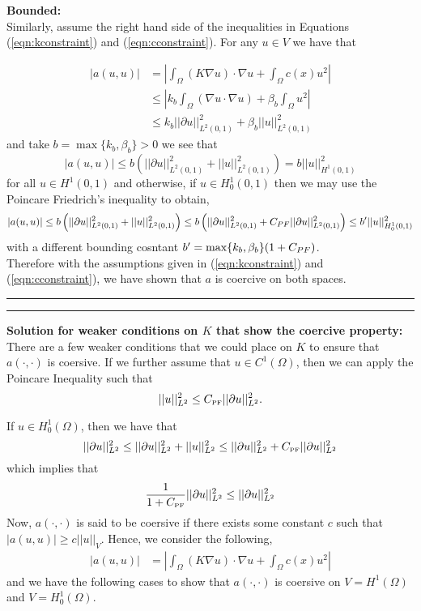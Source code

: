 \documentclass[12pt]{amsart}
\begin{document}
 \noindent\textbf{Bounded:}\\
 
 Similarly, assume the right hand side of the inequalities in Equations (\ref{eqn:kconstraint}) and (\ref{eqn:cconstraint}). For any $u\in V$ we have that 
 
 \begin{align*}
	|a(u,u)| & = \left| \int_\Omega (K\nabla u)\cdot \nabla u + \int_\Omega c(x) u^2 \right|\\
		   & \leq \left| k_b \int_\Omega \left(\nabla u\cdot\nabla u\right) + \beta_b \int_\Omega u^2 \right|\\
		    & \leq k_b ||\partial u||_{L^2(0,1)}^2 + \beta_b || u||_{L^2(0,1)}^2
\end{align*}
and take $b = \max\{k_b, \beta_b\} > 0$ we see that 
	\[ | a(u,u) | \leq b \left( ||\partial u||_{L^2(0,1)}^2 + || u ||_{L^2(0,1)}^2 \right) =  b || u ||_{H^1(0,1)}^2 \]
for all $u\in H^1(0,1)$ and otherwise, if $u\in H_0^1(0,1)$ then we may use the Poincare Friedrich's inequality to obtain,
	\[ | a(u,u) | \leq b \left( ||\partial u||_{L^2(0,1)}^2 + || u ||_{L^2(0,1)}^2 \right) \leq b \left( ||\partial u||_{L^2(0,1)}^2 + C_{\small PF}|| \partial u ||_{L^2(0,1)}^2 \right) \leq b' || u ||_{H_0^1(0,1)}^2 \]
with a different bounding cosntant $b' =  \max\{k_b, \beta_b\}( 1 + C_{\small PF})$.\\

Therefore with the assumptions given in (\ref{eqn:kconstraint}) and (\ref{eqn:cconstraint}), we have shown that $a$ is coercive on both spaces.\\

\medskip
\hrule
\hrule
\medskip 

\noindent\textbf{Solution for weaker conditions on $K$ that show the coercive property:}\\

There are a few weaker conditions that we could place on $K$ to ensure that $a(\cdot,\cdot)$ is coersive. If we further assume that $u\in C^1(\Omega)$, then we can apply the Poincare Inequality such that 
        \[|| u ||_{L^2}^2 \leq C_{\text{\tiny PF}}||\partial u||_{L^2}^2.\]

If $u\in H_0^1(\Omega)$, then we have that 
	\begin{equation}\label{eqn:1}
		||\partial u ||_{L^2}^2 \leq || \partial u ||_{L^2}^2 + || u ||_{L^2}^2 \leq || \partial u ||_{L^2}^2 + C_{\text{\tiny PF}}||\partial u||_{L^2}^2
	\end{equation}
which implies that 
	\begin{equation}\label{eqn:2}
		\frac{1}{1 + C_{\text{\tiny PF}}} ||\partial u||_{L^2}^2 \leq ||\partial u||_{L^2}^2
	\end{equation}
Now, $a(\cdot,\cdot)$ is said to be coersive if there exists some constant $c$ such that $|a(u,u)| \geq c || u||_V$. Hence, we consider the following,
\begin{align}\label{eqn:coersive}
	|a(u,u)| & = \left| \int_\Omega (K\nabla u)\cdot \nabla u + \int_\Omega c(x) u^2 \right|
\end{align}
and we have the following cases to show that $a(\cdot, \cdot)$ is coersive on $V = H^1(\Omega)$ and $V = H_0^1(\Omega)$.\\
\end{document}
